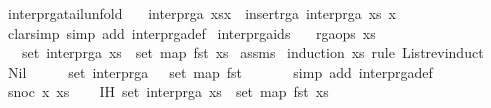 \begin{isabellebody}
%
\endisadelimproof
%
\isamarkuptrue%
\isamarkupfalse%
\ interp{\isacharunderscore}rga{\isacharunderscore}tail{\isacharunderscore}unfold{\isacharcolon}\isanewline
\ \ \ {\isachardoublequoteopen}interp{\isacharunderscore}rga\ {\isacharparenleft}xs{\isacharat}{\isacharbrackleft}x{\isacharbrackright}{\isacharparenright}\ {\isacharequal}\ insert{\isacharunderscore}rga\ {\isacharparenleft}interp{\isacharunderscore}rga\ {\isacharparenleft}xs{\isacharparenright}{\isacharparenright}\ x{\isachardoublequoteclose}\isanewline
%
\isadelimproof
%
\endisadelimproof
%
\isatagproof
{}\isamarkupfalse%
\ {\isacharparenleft}clarsimp\ simp\ add{\isacharcolon}\ interp{\isacharunderscore}rga{\isacharunderscore}def{\isacharparenright}%
\endisatagproof
{\isafoldproof}%
%
\isadelimproof
\isanewline
%
\endisadelimproof
\isanewline
{}\isamarkupfalse%
\ interp{\isacharunderscore}rga{\isacharunderscore}ids{\isacharcolon}\isanewline
\ \ \ {\isachardoublequoteopen}rga{\isacharunderscore}ops\ xs{\isachardoublequoteclose}\isanewline
\ \ \ {\isachardoublequoteopen}set\ {\isacharparenleft}interp{\isacharunderscore}rga\ xs{\isacharparenright}\ {\isacharequal}\ set\ {\isacharparenleft}map\ fst\ xs{\isacharparenright}{\isachardoublequoteclose}\isanewline
%
\isadelimproof
%
\endisadelimproof
%
\isatagproof
{}\isamarkupfalse%
\ assms\ \isamarkupfalse%
{\isacharparenleft}induction\ xs\ rule{\isacharcolon}\ List{\isachardot}rev{\isacharunderscore}induct{\isacharparenright}\isanewline
\ \ \isamarkupfalse%
\ Nil\isanewline
\ \ \isamarkupfalse%
\ \isamarkupfalse%
\ {\isachardoublequoteopen}set\ {\isacharparenleft}interp{\isacharunderscore}rga\ {\isacharbrackleft}{\isacharbrackright}{\isacharparenright}\ {\isacharequal}\ set\ {\isacharparenleft}map\ fst\ {\isacharbrackleft}{\isacharbrackright}{\isacharparenright}{\isachardoublequoteclose}\isanewline
\ \ \ \ \isamarkupfalse%
\ {\isacharparenleft}simp\ add{\isacharcolon}\ interp{\isacharunderscore}rga{\isacharunderscore}def{\isacharparenright}\isanewline
{}\isamarkupfalse%
\isanewline
\ \ \isamarkupfalse%
\ {\isacharparenleft}snoc\ x\ xs{\isacharparenright}\isanewline
\ \ \isamarkupfalse%
\ IH{\isacharcolon}\ {\isachardoublequoteopen}set\ {\isacharparenleft}interp{\isacharunderscore}rga\ xs{\isacharparenright}\ {\isacharequal}\ set\ {\isacharparenleft}map\ fst\ xs{\isacharparenright}{\isachardoublequoteclose}\isanewline

\end{isabellebody}
